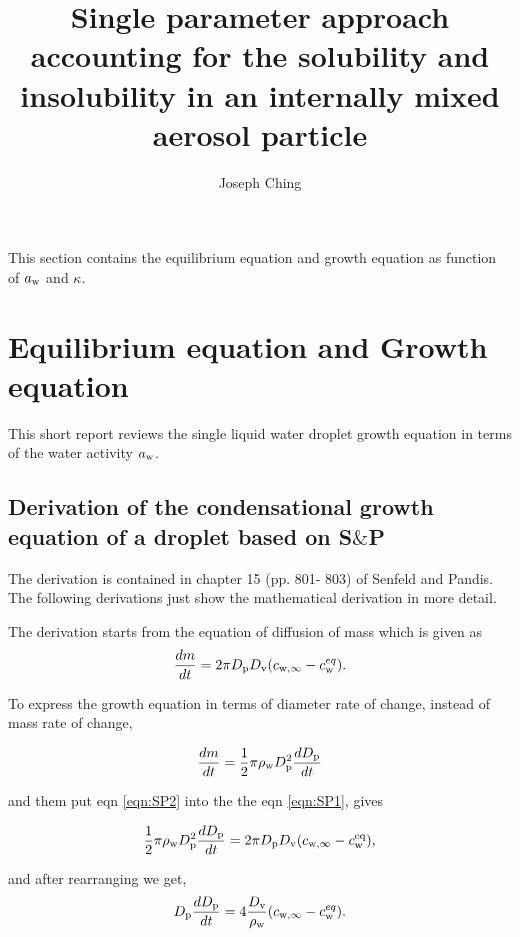 \documentclass[12pt]{article}
\title{Single parameter approach accounting for the solubility and insolubility in an internally mixed aerosol particle}
\author{Joseph Ching}
\begin{document}
\maketitle
\tableofcontents


This section contains the equilibrium equation and growth equation as function of $a_{\rm w}$ and $\kappa$. 


\section{Equilibrium equation and Growth equation}

This short report reviews the single liquid water droplet growth equation in terms of the 
water activity $a_{\rm w}$. 

\subsection{Derivation of the condensational growth equation of a droplet based on S$\&$P}

The derivation is contained in chapter 15 (pp. 801- 803) of Senfeld and Pandis. The following derivations just show the mathematical derivation in more detail.

The derivation starts from the equation of diffusion of mass which is given as
\begin{equation}\label{eqn:SP1}
\frac{dm}{dt}=2 \pi D_{\rm p} D_{\rm v} (c_{\rm w, \infty} - c_{\rm w}^{eq}).  
\end{equation}

To express the growth equation in terms of diameter rate of change, instead of mass rate of change,

\begin{equation}\label{eqn:SP2}
\frac{dm}{dt}=\frac{1}{2} \pi \rho_{\rm w} D_{\rm p}^{2} \frac{dD_{\rm p}}{dt}
\end{equation}

and them put eqn \ref{eqn:SP2} into the the eqn \ref{eqn:SP1}, gives

\begin{equation}\label{eqn:SP3}
\frac{1}{2} \pi \rho_{\rm w} D_{\rm p}^{2} \frac{dD_{\rm p}}{dt}= 2 \pi D_{\rm p} D_{\rm v} (c_{\rm w, \infty} - c_{\rm w}^{\rm eq}),
\end{equation}

and after rearranging we get, 
\begin{equation}\label{eqn:SP4}
D_{\rm p}\frac{dD_{\rm p}}{dt}=4 \frac{D_{\rm v}} {\rho_{\rm w}} (c_{\rm w, \infty} - c_{\rm w}^{eq}).
\end{equation}
\end{document}

